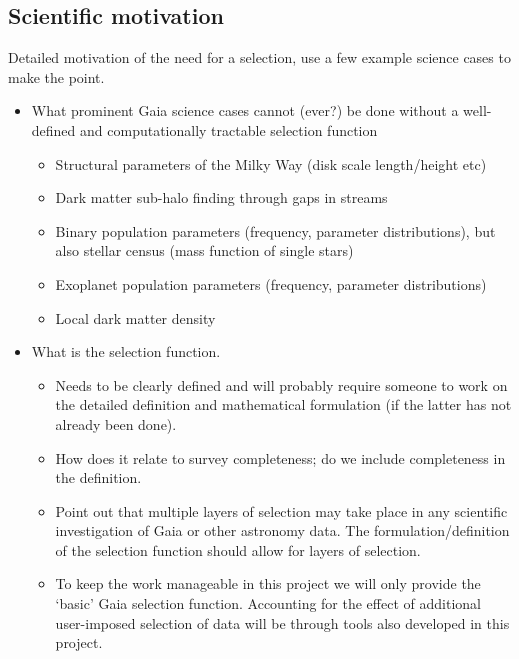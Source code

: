 \subsection{Scientific motivation}
\label{sec:scientific-motivation}



Detailed motivation of the need for a selection, use a few example science cases to make the point.

\begin{itemize}
    \item What prominent Gaia science cases cannot (ever?) be done without a well-defined and computationally tractable
        selection function
        \begin{itemize}
            \item Structural parameters of the Milky Way (disk scale length/height etc)
            \item Dark matter sub-halo finding through gaps in streams
            \item Binary population parameters (frequency, parameter distributions), but also stellar census (mass function of single stars)
            \item Exoplanet population parameters (frequency, parameter distributions)
            \item Local dark matter density
        \end{itemize}
    \item What is the selection function.
        \begin{itemize}
            \item Needs to be clearly defined and will probably require someone to work on the detailed definition and
                mathematical formulation (if the latter has not already been done).
            \item How does it relate to survey completeness; do we include completeness in the definition.
            \item Point out that multiple layers of selection may take place in any scientific investigation of Gaia or
                other astronomy data. The formulation/definition of the selection function should allow for layers of
                selection.
            \item To keep the work manageable in this project we will only provide the `basic' Gaia selection function.
                Accounting for the effect of additional user-imposed selection of data will be through tools also
                developed in this project.

\end{itemize}
\end{itemize}
